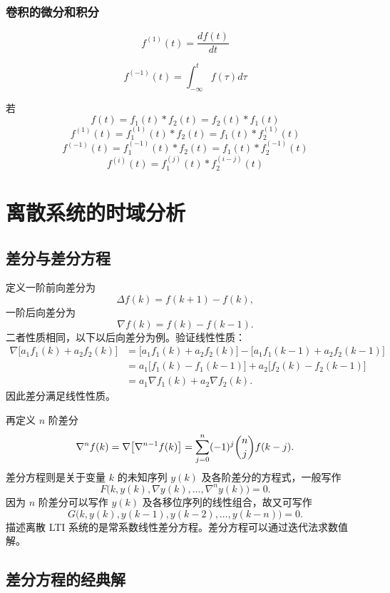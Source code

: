 \subsection{卷积的微分和积分}
\begin{definition*}
   \[ f^{(1)}(t)=\frac{df(t)}{dt}
   \]
\end{definition*}
\begin{definition*}
   \[ f^{(-1)}(t)=\int_{-\infty}^t f(\tau)d\tau
   \]
\end{definition*}
若
\[
f(t)=f_1(t)*f_2(t)=f_2(t)*f_1(t)
\]
\[
    f^{(1)}(t)=f_1^{(1)}(t)*f_2(t)=f_1(t)*f_2^{(1)}(t)
\]
\[
    f^{(-1)}(t)=f_1^{(-1)}(t)*f_2(t)=f_1(t)*f_2^{(-1)}(t)
\]
\[
    f^{(i)}(t)=f_1^{(j)}(t)*f_2^{(i-j)}(t)
\]
\chapter{离散系统的时域分析}
\chaptertoc

\section{差分与差分方程}

定义一阶前向差分为
\[
    \Delta f(k)=f(k+1)-f(k),
\]
一阶后向差分为
\[
    \nabla f(k)=f(k)-f(k-1).
\]
二者性质相同，以下以后向差分为例。验证线性性质：
\[
\begin{aligned}
\nabla\bigl[a_1f_1(k)+a_2f_2(k)\bigr]
&= \bigl[a_1f_1(k)+a_2f_2(k)\bigr]-\bigl[a_1f_1(k-1)+a_2f_2(k-1)\bigr]\\
&= a_1\bigl[f_1(k)-f_1(k-1)\bigr]+a_2\bigl[f_2(k)-f_2(k-1)\bigr]\\
&= a_1\nabla f_1(k)+a_2\nabla f_2(k).
\end{aligned}
\]
因此差分满足线性性质。

再定义 $n$ 阶差分
\[
    \nabla^{n}f(k)=\nabla\bigl[\nabla^{n-1}f(k)\bigr]
    =\sum_{j=0}^{n}(-1)^{j}\dbinom{n}{j}f(k-j).
\]
差分方程则是关于变量 $k$ 的未知序列 $y(k)$ 及各阶差分的方程式，一般写作
\[
    F\bigl(k,y(k),\nabla y(k),\dots,\nabla^{n}y(k)\bigr)=0 .
\]
因为 $n$ 阶差分可以写作 $y(k)$ 及各移位序列的线性组合，故又可写作
\[
    G\bigl(k,y(k),y(k-1),y(k-2),\dots,y(k-n)\bigr)=0 .
\]
描述离散 LTI 系统的是常系数线性差分方程。差分方程可以通过迭代法求数值解。

\section{差分方程的经典解}

